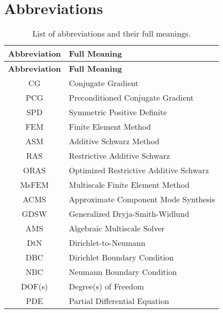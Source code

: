 \section*{Abbreviations}
\begin{longtable}{c p{10cm}}
    \caption{List of abbreviations and their full meanings.}\label{tab:abbreviations} \\
    \hline
    \textbf{Abbreviation} & \textbf{Full Meaning}                                     \\
    \hline
    \endfirsthead

    \hline
    \textbf{Abbreviation} & \textbf{Full Meaning}                                     \\
    \hline
    \endhead

    \hline
    \endfoot

    \hline
    \endlastfoot

    CG                    & Conjugate Gradient                                        \\
    PCG                   & Preconditioned Conjugate Gradient                         \\
    SPD                   & Symmetric Positive Definite                               \\
    FEM                   & Finite Element Method                                     \\
    ASM                   & Additive Schwarz Method                                   \\
    RAS                   & Restrictive Additive Schwarz                              \\
    ORAS                  & Optimized Restrictive Additive Schwarz                    \\
    MsFEM                 & Multiscale Finite Element Method                          \\
    ACMS                  & Approximate Component Mode Synthesis                      \\
    GDSW                  & Generalized Dryja-Smith-Widlund                           \\
    AMS                   & Algebraic Multiscale Solver                               \\
    DtN                   & Dirichlet-to-Neumann                                      \\
    DBC                   & Dirichlet Boundary Condition                              \\
    NBC                   & Neumann Boundary Condition                                \\
    DOF(s)                & Degree(s) of Freedom                                      \\
    PDE                   & Partial Differential Equation                             \\
\end{longtable}

\pagestyle{fancy}